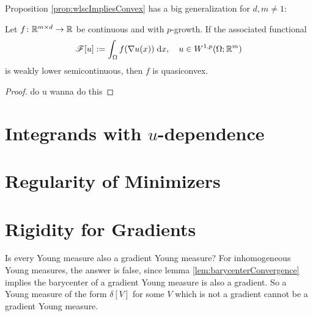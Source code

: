 Proposition \ref{prop:wlscImpliesConvex} has a big generalization for $d,m \neq 1$:
\begin{proposition}
    Let $f \colon \mathbb{R}^{m \times d} \to \mathbb{R}$ be continuous and with $p$-growth. If the associated functional
    \begin{equation}
        \mathscr{F}[u] := \int_\Omega f(\nabla u(x)) \; \mathrm{d} x, \quad u \in W^{1,p}(\Omega;\mathbb{R}^m)
    \end{equation}
    is weakly lower semicontinuous, then $f$ is quasiconvex.
\end{proposition}
\begin{proof}
    {\color{red} do u wanna do this}
\end{proof}


\section{Integrands with $u$-dependence}


\section{Regularity of Minimizers}


\section{Rigidity for Gradients}

Is every Young measure also a gradient Young measure? For inhomogeneous Young measures, the answer is false, since lemma \ref{lem:barycenterConvergence} implies the barycenter of a gradient Young measure is also a gradient. So a Young measure of the form $\delta[V]$ for some $V$ which is not a gradient cannot be a gradient Young measure.

